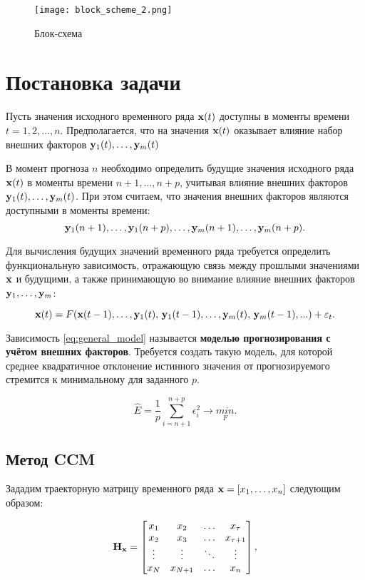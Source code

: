 \documentclass[a4paper, 12pt]{article}
\begin{document}
\begin{figure}[bhtp]
	\texttt{[image: block\_scheme\_2.png]}
	\caption{Блок-схема}
	\label{fig:schema}
\end{figure}

\section{Постановка задачи}
Пусть значения исходного временного ряда $\mathbf{x}(t)$ доступны в  моменты времени $t = 1, 2, \ldots, n$. Предполагается, что на значения $\mathbf{x}(t)$ оказывает влияние набор внешних факторов $\mathbf{y}_1(t), \ldots, \mathbf{y}_m(t)$

В момент прогноза $n$ необходимо определить будущие значения исходного ряда $\mathbf{x}(t)$ в моменты времени $n+1, \ldots, n+p$, учитывая влияние внешних факторов $\mathbf{y}_1(t), \ldots, \mathbf{y}_m(t)$. При этом считаем, что значения внешних факторов являются доступными в моменты времени: \[\mathbf{y}_1(n+1), \ldots, \mathbf{y}_1(n+p), \ldots, \mathbf{y}_m(n+1), \ldots, \mathbf{y}_m(n+p).\]

Для вычисления будущих значений временного ряда требуется определить функциональную зависимость, отражающую связь между прошлыми значениями $\mathbf{x}$ и будущими, а также принимающую во внимание влияние внешних факторов $\mathbf{y}_1, \ldots, \mathbf{y}_m$:

\begin{equation} \label{eq:general_model}
	\mathbf{x}(t) = F(\mathbf{x}(t-1), \ldots, \mathbf{y}_1(t), \, \mathbf{y}_1(t-1), \ldots, \mathbf{y}_m(t), \, \mathbf{y}_m(t-1), ...) + \varepsilon_t.
\end{equation}

Зависимость \eqref{eq:general_model} называется \textbf{моделью прогнозирования с учётом внешних факторов}.
Требуется создать такую модель, для которой среднее квадратичное отклонение истинного значения от прогнозируемого стремится к минимальному для заданного $p$. 

\begin{equation} \label{eq:model_error}
	\hat{E} = \dfrac{1}{p} \sum\limits_{i=n+1}^{n+p} \epsilon_i^2 \rightarrow \underset{F}{min}.
\end{equation}

\subsection{Метод CCM}
Зададим траекторную матрицу временного ряда $\mathbf{x} = [x_1, \ldots, x_n]$ следующим образом: 

\begin{equation*} \label{eq:traj_mat}
	\mathbf{H}_{\mathbf{x}} = \begin{bmatrix}
		x_1 & x_2 & \ldots & x_{\tau} \\
		x_2 & x_3 & \ldots & x_{\tau+1} \\
		\vdots & \vdots & \ddots & \vdots \\
		x_{N} & x_{N+1} & \ldots & x_n
	\end{bmatrix}, 
\end{equation*} 
\end{document}
